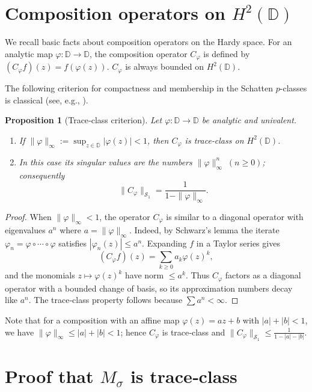 \documentclass{article}
\newtheorem{proposition}[theorem]{Proposition}
\theoremstyle{definition}
\theoremstyle{remark}
\newcommand{\D}{\mathbb{D}}
\begin{document}
\section{Composition operators on \(H^{2}(\D)\)}

We recall basic facts about composition operators on the Hardy space.
For an analytic map \(\varphi:\D\to\D\), the composition operator
\(C_{\varphi}\) is defined by \((C_{\varphi}f)(z)=f(\varphi(z))\).
\(C_{\varphi}\) is always bounded on \(H^{2}(\D)\).

The following criterion for compactness and membership in the Schatten
\(p\)-classes is classical (see, e.g., \cite{Shapiro93, CowenMacCluer}).

\begin{proposition}[Trace‑class criterion]\label{prop:comptrace}
Let \(\varphi:\D\to\D\) be analytic and univalent.
\begin{enumerate}
  \item If \(\|\varphi\|_{\infty} := \sup_{z\in\D}|\varphi(z)| < 1\), then
        \(C_{\varphi}\) is trace‑class on \(H^{2}(\D)\).
  \item In this case its singular values are the numbers
        \(\|\varphi\|_{\infty}^{n}\;(n\ge 0)\); consequently
        \[
        \|C_{\varphi}\|_{\mathcal{S}_{1}} = \frac{1}{1-\|\varphi\|_{\infty}} .
        \]
\end{enumerate}
\end{proposition}
\begin{proof}
When \(\|\varphi\|_{\infty}<1\), the operator \(C_{\varphi}\) is similar to a
diagonal operator with eigenvalues \(a^{n}\) where \(a=\|\varphi\|_{\infty}\).
Indeed, by Schwarz’s lemma the iterate \(\varphi_{n} = \varphi\circ\cdots\circ\varphi\)
satisfies \(|\varphi_{n}(z)|\le a^{n}\).  Expanding \(f\) in a Taylor series
gives
\[
(C_{\varphi}f)(z) = \sum_{k\ge 0} a_{k}\varphi(z)^{k},
\]
and the monomials \(z\mapsto \varphi(z)^{k}\) have norm \(\le a^{k}\).
Thus \(C_{\varphi}\) factors as a diagonal operator with a bounded
change of basis, so its approximation numbers decay like \(a^{n}\).
The trace‑class property follows because \(\sum a^{n}<\infty\).
\end{proof}

Note that for a composition with an affine map
\(\varphi(z)=az+b\) with \(|a|+|b|<1\), we have \(\|\varphi\|_{\infty}\le |a|+|b|<1\);
hence \(C_{\varphi}\) is trace‑class and
\(\|C_{\varphi}\|_{\mathcal{S}_{1}} \le \frac{1}{1-|a|-|b|}\).

\section{Proof that \(M_{\sigma}\) is trace‑class}
\end{document}
